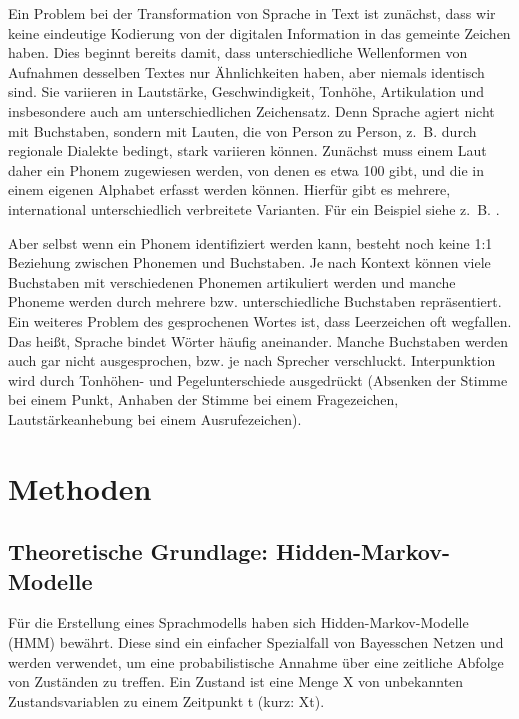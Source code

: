 Ein Problem bei der Transformation von Sprache in Text ist zunächst, dass wir keine eindeutige Kodierung von der digitalen Information in das gemeinte Zeichen haben.
Dies beginnt bereits damit, dass unterschiedliche Wellenformen von Aufnahmen desselben Textes nur Ähnlichkeiten haben, aber niemals identisch sind.
Sie variieren in Lautstärke, Geschwindigkeit, Tonhöhe, Artikulation und insbesondere auch am unterschiedlichen Zeichensatz.
Denn Sprache agiert nicht mit Buchstaben, sondern mit Lauten, die von Person zu Person, z.~B.
durch regionale Dialekte bedingt, stark variieren können.
Zunächst muss einem Laut daher ein Phonem zugewiesen werden, von denen es etwa 100 gibt, und die in einem eigenen Alphabet erfasst werden können.
Hierfür gibt es mehrere, international unterschiedlich verbreitete Varianten.
Für ein Beispiel siehe z.~B. \cite[S. 1056]{russelnorvig}.

Aber selbst wenn ein Phonem identifiziert werden kann, besteht noch keine 1:1 Beziehung zwischen Phonemen und Buchstaben.
Je nach Kontext können viele Buchstaben mit verschiedenen Phonemen artikuliert werden und manche Phoneme werden durch mehrere bzw.
unterschiedliche Buchstaben repräsentiert.
Ein weiteres Problem des gesprochenen Wortes ist, dass Leerzeichen oft wegfallen.
Das heißt, Sprache bindet Wörter häufig aneinander.
Manche Buchstaben werden auch gar nicht ausgesprochen, bzw.
je nach Sprecher verschluckt.
Interpunktion wird durch Tonhöhen- und Pegelunterschiede ausgedrückt (Absenken der Stimme bei einem Punkt, Anhaben der Stimme bei einem Fragezeichen, Lautstärkeanhebung bei einem Ausrufezeichen).

\section{Methoden}
\subsection{Theoretische Grundlage: Hidden-Markov-Modelle}
Für die Erstellung eines Sprachmodells haben sich Hidden-Markov-Modelle (HMM) bewährt.
Diese sind ein einfacher Spezialfall von Bayesschen Netzen und werden verwendet, um eine probabilistische Annahme über eine zeitliche Abfolge von Zuständen zu treffen.
Ein Zustand ist eine Menge X von unbekannten Zustandsvariablen zu einem Zeitpunkt t (kurz: Xt).

